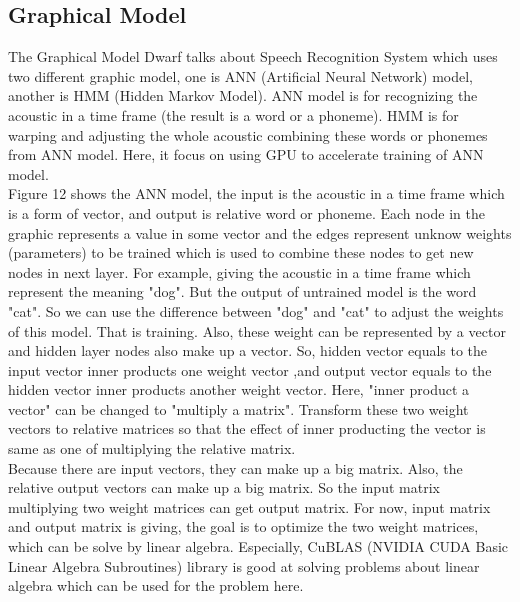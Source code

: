 \documentclass[11pt]{article}
\begin{document}
	\subsection{Graphical Model}
	
The Graphical Model Dwarf talks about Speech Recognition System which uses two different graphic model, one is ANN (Artificial Neural Network) model, another is HMM (Hidden Markov Model). ANN model is for recognizing the acoustic in a time frame (the result is a word or a phoneme). HMM is for warping and adjusting the whole acoustic combining these words or phonemes from ANN model. Here, it focus on using GPU to accelerate training of ANN model. \\

Figure 12 shows the ANN model, the input is the acoustic in a time frame which is a form of vector, and output is relative word or phoneme. Each node in the graphic represents a value in some vector and the edges represent unknow weights (parameters) to be trained which is used to combine these nodes to get new nodes in next layer. For example, giving the acoustic in a time frame which represent the meaning "dog". But the output of untrained model is the word "cat". So we can use the difference between "dog" and "cat" to adjust the weights of this model. That is training. Also, these weight can be represented by a vector and hidden layer nodes also make up a vector. So, hidden vector equals to the input vector inner products one weight vector ,and output vector equals to the hidden vector inner products another weight vector. Here, "inner product a vector" can be changed to "multiply a matrix". Transform these two weight vectors to relative matrices so that the effect of inner producting the vector is same as one of multiplying the relative matrix. \\

Because there are input vectors, they can make up a big matrix. Also, the relative output vectors can make up a big matrix. So the input matrix multiplying two weight matrices can get output matrix. For now, input matrix and output matrix is giving, the goal is to optimize the two weight matrices, which can be solve by linear algebra. Especially, CuBLAS (NVIDIA CUDA Basic Linear Algebra Subroutines) library is good at solving problems about linear algebra which can be used for the problem here.
\end{document}
